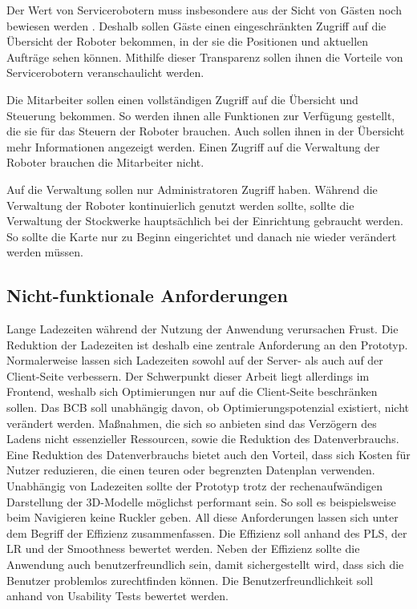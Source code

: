 Der Wert von Servicerobotern muss insbesondere aus der Sicht von Gästen noch bewiesen werden \cite[S.~429]{Paluch2020}. Deshalb sollen Gäste einen eingeschränkten Zugriff auf die Übersicht der Roboter bekommen, in der sie die Positionen und aktuellen Aufträge sehen können. Mithilfe dieser Transparenz sollen ihnen die Vorteile von Servicerobotern veranschaulicht werden.

Die Mitarbeiter sollen einen vollständigen Zugriff auf die Übersicht und Steuerung bekommen. So werden ihnen alle Funktionen zur Verfügung gestellt, die sie für das Steuern der Roboter brauchen. Auch sollen ihnen in der Übersicht mehr Informationen angezeigt werden. Einen Zugriff auf die Verwaltung der Roboter brauchen die Mitarbeiter nicht.

Auf die Verwaltung sollen nur Administratoren Zugriff haben. Während die Verwaltung der Roboter kontinuierlich genutzt werden sollte, sollte die Verwaltung der Stockwerke hauptsächlich bei der Einrichtung gebraucht werden. So sollte die Karte nur zu Beginn eingerichtet und danach nie wieder verändert werden müssen.

\subsection{Nicht-funktionale Anforderungen}
Lange Ladezeiten während der Nutzung der Anwendung verursachen Frust. Die Reduktion der Ladezeiten ist deshalb eine zentrale Anforderung an den Prototyp. Normalerweise lassen sich Ladezeiten sowohl auf der Server- als auch auf der Client-Seite verbessern. Der Schwerpunkt dieser Arbeit liegt allerdings im Frontend, weshalb sich Optimierungen nur auf die Client-Seite beschränken sollen. Das \ac{BCB} soll unabhängig davon, ob Optimierungspotenzial existiert, nicht verändert werden. Maßnahmen, die sich so anbieten sind das Verzögern des Ladens nicht essenzieller Ressourcen, sowie die Reduktion des Datenverbrauchs. Eine Reduktion des Datenverbrauchs bietet auch den Vorteil, dass sich Kosten für Nutzer reduzieren, die einen teuren oder begrenzten Datenplan verwenden. Unabhängig von Ladezeiten sollte der Prototyp trotz der rechenaufwändigen Darstellung der 3D-Modelle möglichst performant sein. So soll es beispielsweise beim Navigieren keine Ruckler geben. All diese Anforderungen lassen sich unter dem Begriff der Effizienz zusammenfassen. Die Effizienz soll anhand des \ac{PLS}, der \ac{LR} und der Smoothness bewertet werden. Neben der Effizienz sollte die Anwendung auch benutzerfreundlich sein, damit sichergestellt wird, dass sich die Benutzer problemlos zurechtfinden können. Die Benutzerfreundlichkeit soll anhand von Usability Tests bewertet werden.
